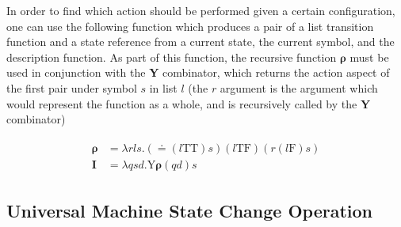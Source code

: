 \documentclass[Master.tex]{subfiles}
\begin{document}


In order to find which action should be performed given a certain configuration, one can use the following function which produces a pair of a list transition function and a state reference from a current state, the current symbol, and the description function. As part of this function, the recursive function $\bm{\rho}$ must be used in conjunction with the \textbf{Y} combinator, which returns the action aspect of the first pair under symbol $s$ in list $l$ (the $r$ argument is the argument which would represent the function as a whole, and is recursively called by the \textbf{Y} combinator)

\begin{gather*}
\begin{aligned}
\bm{\rho} &= \lambda rls.(\bm{\doteq}(l\bm{\mathrm{TT}})s)(l\bm{\mathrm{TF}})(r(l\bm{\mathrm{F}})s)\\
\bm{I} &= \lambda qsd.\bm{\mathrm{Y}\rho}(qd)s
\end{aligned}
\end{gather*}

\subsection{Universal Machine State Change Operation}
\end{document}

